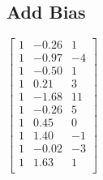 \documentclass[12pt]{article}
\begin{document}
\subsection{Add Bias}\label{bias}
$
\begin{bmatrix}
	1 & -0.26 & 1\\
	1 & -0.97 & -4\\	
	1 & -0.50 & 1\\
	1 &  0.21 & 3\\
	1 & -1.68 & 11\\
	1 & -0.26 & 5\\
	1 & 0.45 & 0\\
	1 & 1.40 & -1\\
	1 & -0.02 & -3\\
	1 & 1.63 & 1\\
\end{bmatrix}
$
\end{document}
